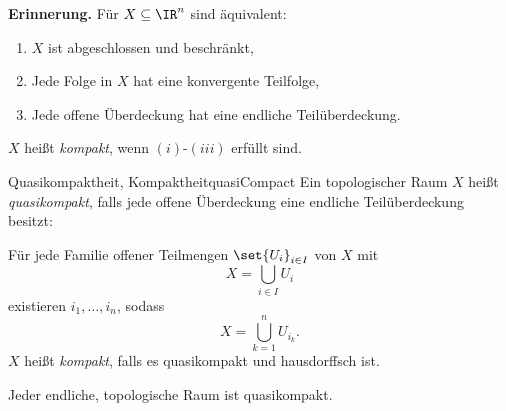 \documentclass[language=ngerman]{TemplateLecture} %
\begin{document}
\textbf{Erinnerung.} Für $X \subseteq \IR^n$ sind äquivalent:
\begin{enumerate}[$(i)$]
    \item $X$ ist abgeschlossen und beschränkt,
    \item Jede Folge in $X$ hat eine konvergente Teilfolge,
    \item Jede offene Überdeckung hat eine endliche Teilüberdeckung.
\end{enumerate}
$X$ heißt \emph{kompakt}, wenn $(i)$-$(iii)$ erfüllt sind.

\begin{defi}{Quasikompaktheit, Kompaktheit}{quasiCompact}
    Ein topologischer Raum $X$ heißt \emph{quasikompakt}, falls jede offene Überdeckung eine endliche Teilüberdeckung besitzt:

    Für jede Familie offener Teilmengen $\set{U_i}_{i \in I}$ von $X$ mit 
    \begin{equation*}
        X = \bigcup_{i \in I} U_i
    \end{equation*}
    existieren $i_1, \ldots, i_n$, sodass
    \begin{equation*}
        X = \bigcup_{k = 1}^n U_{i_k}.
    \end{equation*}
    $X$ heißt \emph{kompakt}, falls es quasikompakt und hausdorffsch ist.
\end{defi}

\begin{example}
    Jeder endliche, topologische Raum ist quasikompakt.
\end{example}
\end{document}
